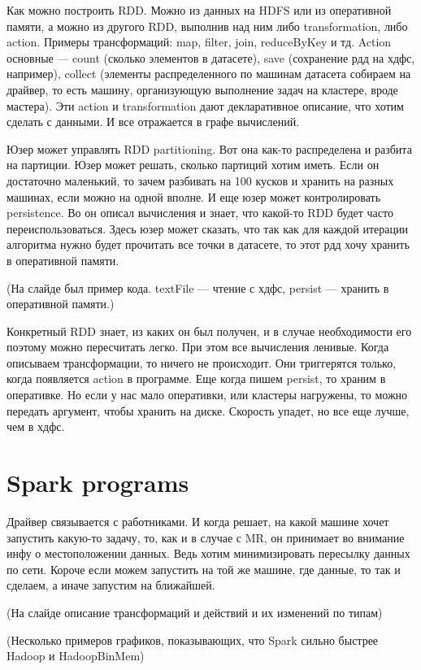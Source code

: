 Как можно построить RDD. Можно из данных на HDFS или из оперативной памяти, а можно из другого RDD, выполнив над ним либо transformation, либо action. Примеры трансформаций: map, filter, join, reduceByKey и тд. Action основные --- count (сколько элементов в датасете), save (сохранение рдд на хдфс, например), collect (элементы распределенного по машинам датасета собираем на драйвер, то есть машину, организующую выполнение задач на кластере, вроде мастера). Эти action и transformation дают декларативное описание, что хотим сделать с данными. И все отражается в графе вычислений.
    
Юзер может управлять RDD partitioning. Вот она как-то распределена и разбита на партиции. Юзер может решать, сколько партиций хотим иметь. Если он достаточно маленький, то зачем разбивать на 100 кусков и хранить на разных машинах, если можно на одной вполне. И еще юзер может контролировать persistence. Во он описал вычисления и знает, что какой-то RDD будет часто переиспользоваться. Здесь юзер может сказать, что так как для каждой итерации алгоритма нужно будет прочитать все точки в датасете, то этот рдд хочу хранить в оперативной памяти.

(На слайде был пример кода. textFile --- чтение с хдфс, persist --- хранить в оперативной памяти.)

Конкретный RDD знает, из каких он был получен, и в случае необходимости его поэтому можно пересчитать легко. При этом все вычисления ленивые. Когда описываем трансформации, то ничего не происходит. Они триггерятся только, когда появляется action в программе. Еще когда пишем persist, то храним в оперативке. Но если у нас мало оперативки, или кластеры нагружены, то можно передать аргумент, чтобы хранить на диске. Скорость упадет, но все еще лучше, чем в хдфс. 

\section{Spark programs}

Драйвер связывается с работниками. И когда решает, на какой машине хочет запустить какую-то задачу, то, как и в случае с MR, он принимает во внимание инфу о местоположении данных. Ведь хотим минимизировать пересылку данных по сети. Короче если можем запустить на той же машине, где данные, то так и сделаем, а иначе запустим на ближайшей.

(На слайде описание трансформаций и действий и их изменений по типам)

(Несколько примеров графиков, показывающих, что Spark сильно быстрее Hadoop и HadoopBinMem)

